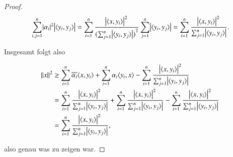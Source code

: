 \begin{proof}
  \begin{equation*}
    \sum_{i,j=1}^n{\abs{\alpha_i}^2 \abs{\langle {y_i},{y_j} \rangle}}
    = \sum_{i=1}^n{\frac{\abs{\langle {x},{y_i} \rangle}^2}{{(\sum_{j=1}^n{\abs{\langle {y_i},{y_j} \rangle}})}^2} \sum_{j=1}^n{\abs{\langle {y_i},{y_j} \rangle}}}
    = \sum_{i=1}^n{\frac{\abs{\langle {x},{y_i} \rangle}^2}{\sum_{j=1}^n{\abs{\langle {y_i},{y_j} \rangle}}}}.
  \end{equation*}

  Insgesamt folgt also

  \begin{equation*}
    \begin{split}
      \norm{x}^2 &\geq \sum_{i=1}^n{\overline{\alpha_i}{\langle {x},{y_i} \rangle}} + \sum_{i=1}^n{\alpha_i \langle {y_i},{x} \rangle} - \sum_{i=1}^n{\frac{\abs{\langle {x},{y_i} \rangle}^2}{\sum_{j=1}^n{\abs{\langle {y_i},{y_j} \rangle}}}} \\
      &= \sum_{i=1}^n{\frac{\abs{\langle {x},{y_i} \rangle}^2}{\sum_{j=1}^n{\abs{\langle {y_i},{y_j} \rangle}}}} + \sum_{i=1}^n{\frac{\abs{\langle {x},{y_i} \rangle}^2}{\sum_{j=1}^n{\abs{\langle {y_i},{y_j} \rangle}}}} - \sum_{i=1}^n{\frac{\abs{\langle {x},{y_i} \rangle}^2}{\sum_{j=1}^n{\abs{\langle {y_i},{y_j} \rangle}}}} \\
      &= \sum_{i=1}^n{\frac{\abs{\langle {x},{y_i} \rangle}^2}{\sum_{j=1}^n{\abs{\langle {y_i},{y_j} \rangle}}}},
    \end{split}
  \end{equation*}

  also genau was zu zeigen war.
\end{proof}
